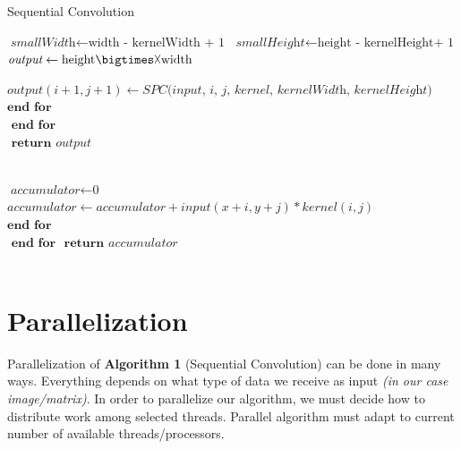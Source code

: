 \documentclass{article}
\begin{document}
\begin{algorithm}[tbph]
\caption{Sequential Convolution }
\label{alg:MYALG}
\begin{algorithmic}[1]
\State $\textit{smallWidth} \gets \text{width - kernelWidth + 1}\textit{}$
\State $\textit{smallHeight} \gets \text{height - kernelHeight+ 1}\textit{}$
\State $\textit{output} \gets \text{height$  {\bigtimes}{\vartimes} $width}\textit{}$ 

 \State {}
   \State $output(i+1,j+1)\gets \textit{SPC(input, i, j, kernel, kernelWidth, kernelHeight)}$\\
   \EndFor $\textbf{end for}$\\
 \State \EndFor $\textbf{ end for}$\\
 \State $\textbf{ return } output$
 
\endFunction\\

\State $\textit{accumulator} \gets \text{0}\textit{}$
 \State {}
   \State $accumulator\gets \textit{accumulator} + input(x+i,y+j) * kernel(i,j)$\\
   \EndFor $\textbf{end for}$\\
 \EndFor $\textbf{ end for}$
 \State $\textbf{ return } accumulator$
\\
\\




\end{algorithmic}
\end{algorithm}


\section{Parallelization}

Parallelization of \textbf{Algorithm 1} (Sequential Convolution) can be done in many ways. Everything depends on what type of data we receive as input \textit{(in our case image/matrix)}. In order to parallelize our algorithm, we must decide how to distribute work among selected threads. Parallel algorithm must adapt to current number of available threads/processors.
\end{document}
